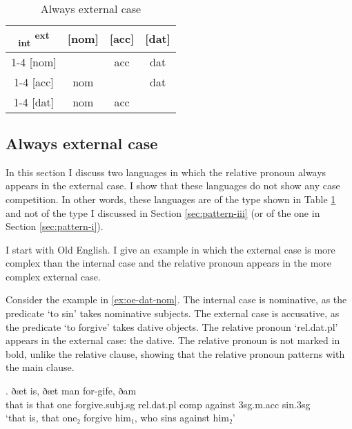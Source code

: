 \begin{table}[H]
  \center
  \caption{Always external case}
  \begin{tabular}{c|c|c|c}
    \toprule
   \textsubscript{\ac{int}} \textsuperscript{\ac{ext}}
          & [\ac{nom}]
          & [\ac{acc}]
          & [\ac{dat}]
          \\ \cmidrule{1-4}
      [\ac{nom}]
          & \xcancel{\phantom{xx}}
          & \ac{acc}
          & \ac{dat}
          \\ \cmidrule{1-4}
      [\ac{acc}]
          & \ac{nom}
          & \xcancel{\phantom{xx}}
          & \ac{dat}
          \\ \cmidrule{1-4}
      [\ac{dat}]
          & \ac{nom}
          & \ac{acc}
          & \xcancel{\phantom{xx}}
          \\
    \bottomrule
  \end{tabular}
  \label{tbl:no-case-competition-ext}
\end{table}


\subsection{Always external case}

In this section I discuss two languages in which the relative pronoun always appears in the external case. I show that these languages do not show any case competition. In other words, these languages are of the type shown in Table \ref{tbl:no-case-competition-ext} and not of the type I discussed in Section \ref{sec:pattern-iii} (or of the one in Section \ref{sec:pattern-i}).

I start with Old English. I give an example in which the external case is more complex than the internal case and the relative pronoun appears in the more complex external case.

Consider the example in \ref{ex:oe-dat-nom}.
The internal case is nominative, as the predicate  `to sin' takes nominative subjects.
The external case is accusative, as the predicate  `to forgive' takes dative objects.
The relative pronoun  `\ac{rel}.\ac{dat}.\ac{pl}' appears in the external case: the dative. The relative pronoun is not marked in bold, unlike the relative clause, showing that the relative pronoun patterns with the main clause.

\exg. ðæt is, ðæt man for-gife, ðam    \\
 that is that one forgive.\ac{subj}.\ac{sg}\scsub{[dat]} \ac{rel}.\ac{dat}.\ac{pl} \ac{comp} against 3\ac{sg}.\ac{m}.\ac{acc} sin.3\ac{sg}\scsub{[nom]}\\
 `that is, that one₂ forgive him₁, who sins against him₂'  \label{ex:oe-dat-nom}

